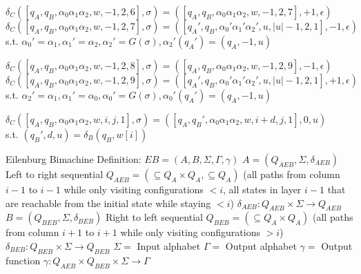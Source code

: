 \documentclass[12pt, a4paper]{article}
\begin{document}
\begin{algorithmic}
    \STATE $\delta_C([q_A, q_B, \alpha_0 \alpha_1 \alpha_2, w, -1, 2, 6], \sigma) = ([q_A, q_B, \alpha_0 \alpha_1 \alpha_2, w, -1, 2, 7], +1, \epsilon)$
    \STATE $\delta_C([q_A, q_B, \alpha_0 \alpha_1 \alpha_2, w, -1, 2, 7], \sigma) = ([q_A', q_B, \alpha_0' \alpha_1' \alpha_2', u, |u|-1, 2, 1], -1, \epsilon)$\\s.t. $\alpha_0' = \alpha_1, \alpha_1' = \alpha_2, \alpha_2' = G(\sigma), \alpha_2'(q_A') = (q_A, -1, u)$

    \STATE $\delta_C([q_A, q_B, \alpha_0 \alpha_1 \alpha_2, w, -1, 2, 8], \sigma) = ([q_A, q_B, \alpha_0 \alpha_1 \alpha_2, w, -1, 2, 9], -1, \epsilon)$
    \STATE $\delta_C([q_A, q_B, \alpha_0 \alpha_1 \alpha_2, w, -1, 2, 9], \sigma) = ([q_A', q_B, \alpha_0' \alpha_1' \alpha_2', u, |u|-1, 2, 1], +1, \epsilon)$\\s.t. $\alpha_2' = \alpha_1, \alpha_1' = \alpha_0, \alpha_0' = G(\sigma), \alpha_0'(q_A') = (q_A, -1, u)$

    \STATE $\delta_C([q_A, q_B, \alpha_0 \alpha_1 \alpha_2, w, i, j, 1], \sigma) = ([q_A, q_B', \alpha_0 \alpha_1 \alpha_2, w, i+d, j, 1], 0, u)$\\s.t. $(q_B', d, u) = \delta_B(q_B, w[i])$
\end{algorithmic}
\pagebreak
\begin{algorithmic}
    \STATE Eilenburg Bimachine Definition:
    \STATE $EB = (A, B, \Sigma, \Gamma, \gamma)$
    \STATE $A = (Q_{AEB}, \Sigma, \delta_{AEB})$ Left to right sequential
    \STATE $Q_{AEB} = (\subseteq Q_A \times Q_A, \subseteq Q_A)$ (all paths from column $i-1$ to $i-1$ while only visiting configurations $< i$, all states in layer $i-1$ that are reachable from the initial state while staying $< i$)
    \STATE $\delta_{AEB}: Q_{AEB} \times \Sigma \to Q_{AEB}$
    \STATE $B = (Q_{BEB}, \Sigma, \delta_{BEB})$ Right to left sequential
    \STATE $Q_{BEB} = (\subseteq Q_A \times Q_A)$ (all paths from column $i+1$ to $i + 1$ while only visiting configurations $> i$)
    \STATE $\delta_{BEB}: Q_{BEB} \times \Sigma \to Q_{BEB}$
    \STATE $\Sigma = $ Input alphabet
    \STATE $ \Gamma = $ Output alphabet
    \STATE $\gamma = $ Output function
    \STATE $\gamma: Q_{AEB} \times Q_{BEB} \times \Sigma \to \Gamma$
\end{algorithmic}
\end{document}
